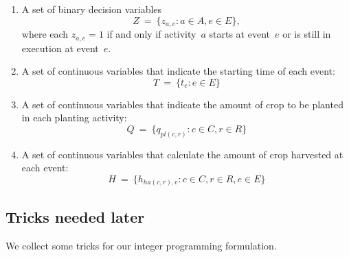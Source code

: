 \documentclass[11pt,reqno]{amsart}
\numberwithin{equation}{section}
\begin{document}
\begin{enumerate}
\item A set of binary decision variables 
  \[
     Z
     \ = \
     \big\{z_{a,e}: a\in A, e\in E\big\},
  \]
  where each $z_{a,e}=1$ if and only if activity~$a$ starts at
  event~$e$ or is still in execution at event~$e$.

\smallskip
\item A set of continuous variables that indicate the starting time of each event:
  \[
     T
     \ = \
     \big\{t_e : e\in E\big\}
  \]

\smallskip
\item A set of continuous variables that indicate the amount of crop to be planted in each
  planting activity:
  \[
     Q
     \ = \
     \big\{q_{pl(c,r)} : c\in C, r\in R\big\}
  \]

\smallskip
\item A set of continuous variables that calculate the amount of crop harvested at each event:
  \[
     H
     \ = \
     \big\{h_{ha(c,r),e} : c\in C, r\in R, e\in E\big\}
  \]

\end{enumerate}

\subsection{Tricks needed later}\label{sec:tricks}

We collect some tricks for our integer programming formulation.
\end{document}
